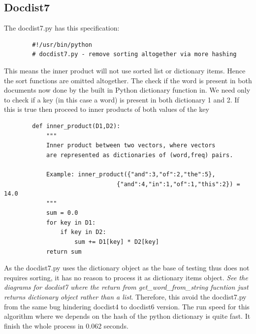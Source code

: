 \documentclass{article}
\begin{document}
    \subsection{Docdist7}
    The docdist7.py has this specification:
    \begin{lstlisting}
        #!/usr/bin/python
        # docdist7.py - remove sorting altogether via more hashing
    \end{lstlisting}
    This means the inner product will not use sorted list or dictionary items. Hence the sort functions are omitted altogether.
    The check if the word is present in both documents now done by the built in Python dictionary function in. 
    We need only to check if a key (in this case a word) is present in both dictionary 1 and 2. 
    If this is true then proceed to inner products of both values of the key
    \begin{lstlisting}
        def inner_product(D1,D2):
            """
            Inner product between two vectors, where vectors
            are represented as dictionaries of (word,freq) pairs.

            Example: inner_product({"and":3,"of":2,"the":5},
                                {"and":4,"in":1,"of":1,"this":2}) = 14.0 
            """
            sum = 0.0
            for key in D1:
                if key in D2:
                    sum += D1[key] * D2[key]
            return sum
    \end{lstlisting}
    As the docdist7.py uses the dictionary object as the base of testing thus does not requires sorting, it has no reason to process it as dictionary items object.
    \textit{See the diagrams for docdist7 where the return from get\_word\_from\_string fucntion just returns dictionary object rather than a list}.
    Therefore, this avoid the docdist7.py from the same bug hindering docdist4 to docdist6 version.
    The run speed for this algorithm where we depends on the hash of the python dictionary is quite fast. It finish the whole process in 0.062 seconds.
\end{document}
